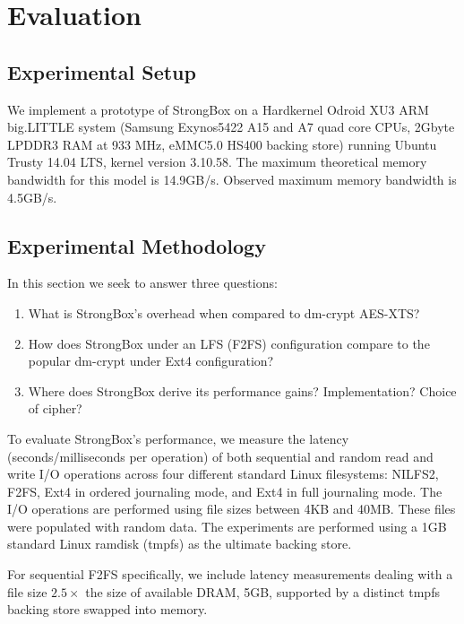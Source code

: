 \section{Evaluation} \label{sec:sb-evaluation}

\subsection{Experimental Setup}

We implement a prototype of StrongBox on a Hardkernel Odroid XU3 ARM big.LITTLE
system (Samsung Exynos5422 A15 and A7 quad core CPUs, 2Gbyte LPDDR3 RAM at 933
MHz, eMMC5.0 HS400 backing store) running Ubuntu Trusty 14.04 LTS, kernel
version 3.10.58. The maximum theoretical memory bandwidth for this model is
14.9GB/s\@. Observed maximum memory bandwidth is 4.5GB/s.

\subsection{Experimental Methodology}

In this section we seek to answer three questions:
\begin{enumerate}
\item What is StrongBox's overhead when compared to dm-crypt AES-XTS?
\item How does StrongBox under an LFS (\ie F2FS) configuration compare to
the popular dm-crypt under Ext4 configuration?
\item Where does StrongBox derive its performance gains? Implementation? Choice
of cipher?
\end{enumerate}

To evaluate StrongBox's performance, we measure the latency
(seconds/milliseconds per operation) of both sequential and random
read and write I/O operations across four different standard Linux
filesystems: NILFS2, F2FS, Ext4 in ordered journaling mode, and Ext4
in full journaling mode. The I/O operations are performed using file
sizes between 4KB and 40MB. These files were populated with random
data. The experiments are performed using a 1GB standard Linux ramdisk
(tmpfs) as the ultimate backing store.

For sequential F2FS specifically, we include latency measurements dealing
with a file size $2.5\times$ the size of available DRAM, \ie
5GB, supported by a distinct tmpfs backing store swapped into memory.

